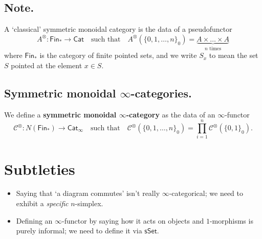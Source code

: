 \documentclass{article}
\numberwithin{equation}{subsection}
\renewcommand{\ss}[1]{\subsection{#1}}
\newcommand{\sset}{\mathsf{sSet}}
\newcommand{\C}{\mathcal{C}}
\begin{document}
        \ss{Note.}
            A `classical' symmetric monoidal category is the data of a pseudofunctor
            \[
                A^\otimes\colon\mathsf{Fin}_*\to\mathsf{Cat}
                \quad\text{such that}\quad
                A^\otimes(\{0,1,\ldots,n\}_0) = \underbrace{A\times\ldots\times A}_{n\text{ times}}
            \]
            where $\mathsf{Fin}_*$ is the category of finite pointed sets, and we write $S_x$ to mean the set $S$ pointed at the element $x\in S$.

        \ss{Symmetric monoidal $\infty$-categories.}
            We define a \textbf{symmetric monoidal $\infty$-category} as the data of an $\infty$-functor
            \[
                \C^\otimes\colon N(\mathsf{Fin}_*)\to\mathsf{Cat}_\infty
                \quad\text{such that}\quad
                \C^\otimes(\{0,1,\ldots,n\}_0) = \prod_{i=1}^n\C^\otimes(\{0,1\}_0).
            \]

    \section{Subtleties}

        \begin{itemize}
            \item Saying that `a diagram commutes' isn't really $\infty$-categorical; we need to exhibit a \emph{specific} $n$-simplex.
            \item Defining an $\infty$-functor by saying how it acts on objects and $1$-morphisms is purely informal; we need to define it via $\sset$.
        \end{itemize}
\end{document}
